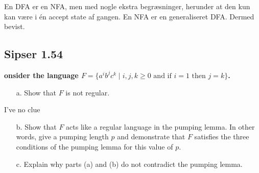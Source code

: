 En DFA er en NFA, men med nogle ekstra begræsninger, herunder at den kun kan være i én accept state af gangen. En NFA er en generaliseret DFA. Dermed bevist.

\subsection{Sipser 1.54}%
\label{subsec:sipser1.54}
\textbf{onsider the language \( F = \{a^i b^j c^k \mid i,j,k \geq 0 \text{ and if } i = 1 \text{ then } j = k\} \).}

\begin{enumerate}
    \item[a.] Show that \( F \) is not regular.
\end{enumerate}

I've no clue

\begin{enumerate}
    \item[b.] Show that \( F \) acts like a regular language in the pumping lemma. In other words, give a pumping length \( p \) and demonstrate that \( F \) satisfies the three conditions of the pumping lemma for this value of \( p \).
\end{enumerate}
\begin{enumerate}
    \item[c.] Explain why parts (a) and (b) do not contradict the pumping lemma.
\end{enumerate}




